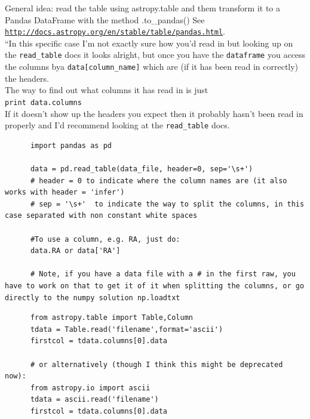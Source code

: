 \documentclass[11pt,a4paper]{article}
\begin{document}
    \smallskip
    \smallskip
    \noindent
    General idea: read the table using astropy.table and them transform it to a Pandas DataFrame with the method .to\_pandas()
    See \\
    \href{http://docs.astropy.org/en/stable/table/pandas.html}{\tt http://docs.astropy.org/en/stable/table/pandas.html}. \\

    \smallskip
    \smallskip
    \noindent
    ``In this specific case I'm not exactly sure how you'd read in but
    looking up on the {\tt read\_table} docs it looks alright, but once
    you have the {\tt dataframe} you access the columns bya
    {\tt data[column\_name]} which are (if it has been read in correctly) the
    headers. \\
    
    \smallskip
    \smallskip
    \noindent
    The way to find out what columns it has read in is just\\
    {\tt print data.columns}\\

    \noindent
    If it doesn't show up the headers you expect then it probably
    hasn't been read in properly and I'd recommend looking at the
    {\tt read\_table} docs. 
    

    \begin{lstlisting}
      import pandas as pd
      
      data = pd.read_table(data_file, header=0, sep='\s+')
      # header = 0 to indicate where the column names are (it also works with header = 'infer')
      # sep = '\s+'  to indicate the way to split the columns, in this case separated with non constant white spaces

      #To use a column, e.g. RA, just do:
      data.RA or data['RA']

      # Note, if you have a data file with a # in the first raw, you have to work on that to get it of it when splitting the columns, or go directly to the numpy solution np.loadtxt 
    \end{lstlisting}
    \medskip     \medskip     \medskip


    \begin{lstlisting}
      from astropy.table import Table,Column
      tdata = Table.read('filename',format='ascii')
      firstcol = tdata.columns[0].data
      
      # or alternatively (though I think this might be deprecated now):
      from astropy.io import ascii
      tdata = ascii.read('filename')
      firstcol = tdata.columns[0].data
    \end{lstlisting}
    \medskip     \medskip     \medskip
\end{document}
